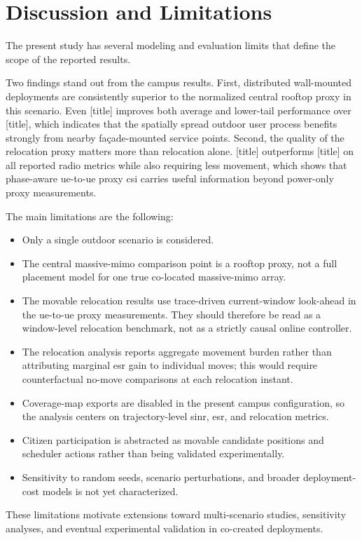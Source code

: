 \section{Discussion and Limitations}

The present study has several modeling and evaluation limits that define the scope of the reported results.

Two findings stand out from the campus results. First, distributed wall-mounted deployments are consistently superior to the normalized central rooftop proxy in this scenario. Even [title] improves both average and lower-tail performance over [title], which indicates that the spatially spread outdoor user process benefits strongly from nearby façade-mounted service points. Second, the quality of the relocation proxy matters more than relocation alone. [title] outperforms [title] on all reported radio metrics while also requiring less movement, which shows that phase-aware \gls{ue}-to-\gls{ue} proxy \gls{csi} carries useful information beyond power-only proxy measurements.

The main limitations are the following:
\begin{itemize}
    \item Only a single outdoor scenario is considered.
    \item The central massive-\gls{mimo} comparison point is a rooftop proxy, not a full placement model for one true co-located massive-\gls{mimo} array.
    \item The movable relocation results use trace-driven current-window look-ahead in the \gls{ue}-to-\gls{ue} proxy measurements. They should therefore be read as a window-level relocation benchmark, not as a strictly causal online controller.
    \item The relocation analysis reports aggregate movement burden rather than attributing marginal \gls{esr} gain to individual moves; this would require counterfactual no-move comparisons at each relocation instant.
    \item Coverage-map exports are disabled in the present campus configuration, so the analysis centers on trajectory-level \gls{sinr}, \gls{esr}, and relocation metrics.
    \item Citizen participation is abstracted as movable candidate positions and scheduler actions rather than being validated experimentally.
    \item Sensitivity to random seeds, scenario perturbations, and broader deployment-cost models is not yet characterized.
\end{itemize}

These limitations motivate extensions toward multi-scenario studies, sensitivity analyses, and eventual experimental validation in co-created deployments.
